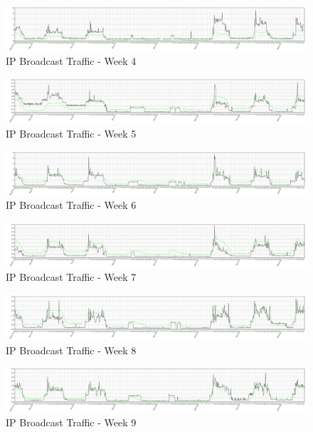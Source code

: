\documentclass[12pt,a4paper,cucitura]{toptesi}
\begin{document}
\begin{figure}
\centering
\includegraphics[width=\textwidth]{bcast4.png}
\caption{IP Broadcast Traffic - Week 4}
\end{figure}

\begin{figure}
\centering
\includegraphics[width=\textwidth]{bcast5.png}
\caption{IP Broadcast Traffic - Week 5}
\end{figure}

\begin{figure}
\centering
\includegraphics[width=\textwidth]{bcast6.png}
\caption{IP Broadcast Traffic - Week 6}
\end{figure}

\begin{figure}
\centering
\includegraphics[width=\textwidth]{bcast7.png}
\caption{IP Broadcast Traffic - Week 7}
\end{figure}

\begin{figure}
\centering
\includegraphics[width=\textwidth]{bcast8.png}
\caption{IP Broadcast Traffic - Week 8}
\end{figure}

\begin{figure}
\centering
\includegraphics[width=\textwidth]{bcast9.png}
\caption{IP Broadcast Traffic - Week 9}
\end{figure}
\end{document}
